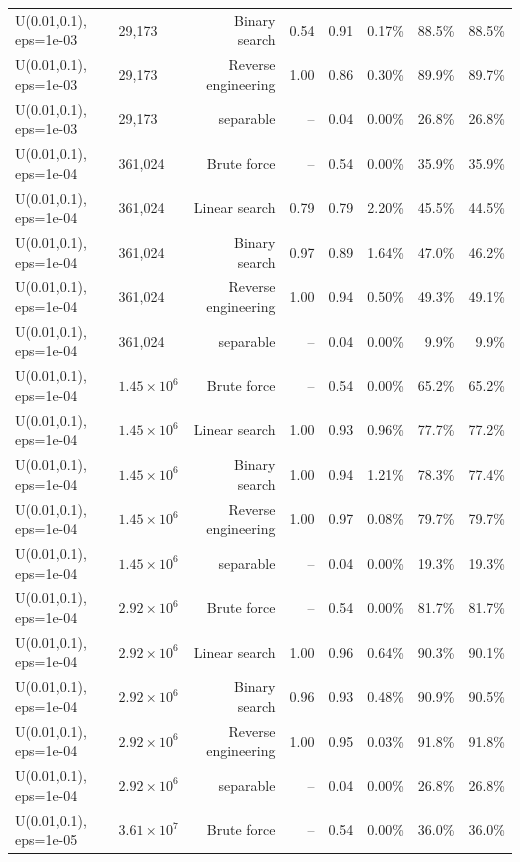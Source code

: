 \begin{tabular}{llrrrrrr}
U(0.01,0.1), eps=1e-03 & 29,173 & Binary search & 0.54 & 0.91 & 0.17\% & 88.5\% & 88.5\% \\
U(0.01,0.1), eps=1e-03 & 29,173 & Reverse engineering & 1.00 & 0.86 & 0.30\% & 89.9\% & 89.7\% \\
U(0.01,0.1), eps=1e-03 & 29,173 & separable & -- & 0.04 & 0.00\% & 26.8\% & 26.8\% \\
U(0.01,0.1), eps=1e-04 & 361,024 & Brute force & -- & 0.54 & 0.00\% & 35.9\% & 35.9\% \\
U(0.01,0.1), eps=1e-04 & 361,024 & Linear search & 0.79 & 0.79 & 2.20\% & 45.5\% & 44.5\% \\
U(0.01,0.1), eps=1e-04 & 361,024 & Binary search & 0.97 & 0.89 & 1.64\% & 47.0\% & 46.2\% \\
U(0.01,0.1), eps=1e-04 & 361,024 & Reverse engineering & 1.00 & 0.94 & 0.50\% & 49.3\% & 49.1\% \\
U(0.01,0.1), eps=1e-04 & 361,024 & separable & -- & 0.04 & 0.00\% & 9.9\% & 9.9\% \\
U(0.01,0.1), eps=1e-04 & $1.45\times 10^{6}$ & Brute force & -- & 0.54 & 0.00\% & 65.2\% & 65.2\% \\
U(0.01,0.1), eps=1e-04 & $1.45\times 10^{6}$ & Linear search & 1.00 & 0.93 & 0.96\% & 77.7\% & 77.2\% \\
U(0.01,0.1), eps=1e-04 & $1.45\times 10^{6}$ & Binary search & 1.00 & 0.94 & 1.21\% & 78.3\% & 77.4\% \\
U(0.01,0.1), eps=1e-04 & $1.45\times 10^{6}$ & Reverse engineering & 1.00 & 0.97 & 0.08\% & 79.7\% & 79.7\% \\
U(0.01,0.1), eps=1e-04 & $1.45\times 10^{6}$ & separable & -- & 0.04 & 0.00\% & 19.3\% & 19.3\% \\
U(0.01,0.1), eps=1e-04 & $2.92\times 10^{6}$ & Brute force & -- & 0.54 & 0.00\% & 81.7\% & 81.7\% \\
U(0.01,0.1), eps=1e-04 & $2.92\times 10^{6}$ & Linear search & 1.00 & 0.96 & 0.64\% & 90.3\% & 90.1\% \\
U(0.01,0.1), eps=1e-04 & $2.92\times 10^{6}$ & Binary search & 0.96 & 0.93 & 0.48\% & 90.9\% & 90.5\% \\
U(0.01,0.1), eps=1e-04 & $2.92\times 10^{6}$ & Reverse engineering & 1.00 & 0.95 & 0.03\% & 91.8\% & 91.8\% \\
U(0.01,0.1), eps=1e-04 & $2.92\times 10^{6}$ & separable & -- & 0.04 & 0.00\% & 26.8\% & 26.8\% \\
U(0.01,0.1), eps=1e-05 & $3.61\times 10^{7}$ & Brute force & -- & 0.54 & 0.00\% & 36.0\% & 36.0\% \\

\end{tabular}
